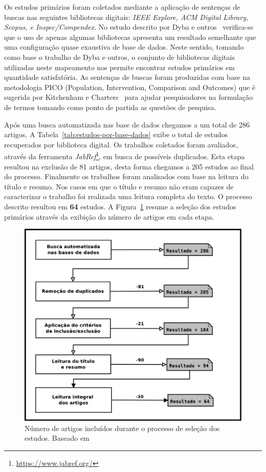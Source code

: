 Os estudos primários foram coletados mediante a aplicação de sentenças de
buscas nas seguintes bibliotecas digitais: \textit{IEEE Explore, ACM Digital
    Library, Scopus, e Inspec/Compendex}. No estudo descrito por Dyba e
outros~\cite{dybaa2007applying} verifica-se que o uso de apenas algumas
bibliotecas apresenta um resultado semelhante que uma configuração quase
exaustiva de base de dados. Neste sentido, tomando como base o trabalho de Dyba
e outros, o conjunto de bibliotecas digitais utilizadas neste mapeamento nos
permite encontrar estudos primários em quantidade satisfatória. As sentenças de
buscas foram produzidas com base na metodologia PICO (Population, Intervention,
Comparison and Outcomes) que é sugerida por Kitchenham e
Charters~\cite{keele2007guidelines} para ajudar pesquisadores na formulação de
termos tomando como ponto de partida as questões de pesquisa.

Após uma busca automatizada nas base de dados chegamos a um total de 286
artigos. A Tabela~\ref{tab:estudos-por-base-dados} exibe o total de estudos
recuperados por biblioteca digital. Os trabalhos coletados foram avaliados,
através da ferramenta \textit{JabRef}\footnote{\url{https://www.jabref.org/}},
em busca de possíveis duplicados. Esta etapa resultou na exclusão de 81 artigos,
desta forma chegamos a 205 estudos ao final do processo. Finalmente os trabalhos
foram analisados com base na leitura do título e resumo. Nos casos em que o
título e resumo não eram capazes de caracterizar o trabalho foi realizada uma
leitura completa do texto. O processo descrito resultou em \textbf{64} estudos.
A Figura~\ref{fig:diagrama-processo-selecao} resume a seleção dos estudos
primários através da exibição do número de artigos em cada etapa.

\begin{figure} \centering \includegraphics[width=0.75\linewidth]
	{./chapter-mapeamento-sistematico/img/diagrama-processo-selecao.pdf}
	\caption{Número de artigos incluídos durante o processo de seleção dos
		estudos. Baseado
		em~\cite{Petersen2015}}\label{fig:diagrama-processo-selecao}
\end{figure}

